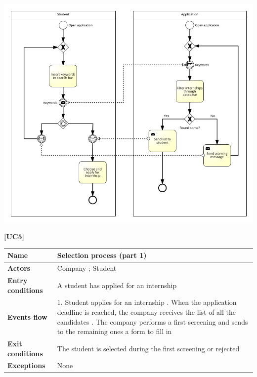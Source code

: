 \documentclass[11pt,twoside]{article}
\begin{document}
\begin{center}
\includegraphics[width=\textwidth]{Images/UC4}
\end{center}

\newpage

\large{\textbf{[UC5]}} \\
\begin{table}[H]
\begin{tabular}{| p{} | p{} |}
\hline
\textbf{Name}
& Selection process (part 1) \\
\hline
\textbf{Actors}
& Company ; Student \\
\hline
\textbf{Entry conditions}
& A student has applied for an internship \\
\hline
\textbf{Events flow}
& 1. Student applies for an internship \newline
2. When the application deadline is reached, the company receives the list of all the candidates \newline
3. The company performs a first screening and sends to the remaining ones a form to fill in \\
\hline
\textbf{Exit conditions}
& The student is selected during the first screening or rejected \\
\hline
\textbf{Exceptions}
& None \\
\hline
\end{tabular}
\end{table}
\end{document}
